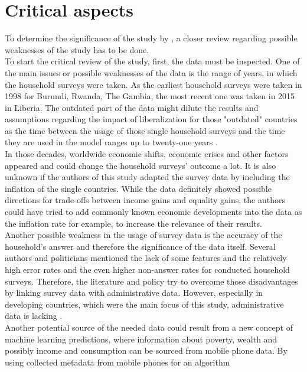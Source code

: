 \section{Critical aspects}

To determine the significance of the study by \cite{Artuc.2019}, a closer review regarding possible weaknesses of the
study has to be done.\\

To start the critical review of the study, first, the data must be inspected. One of the main issues or possible weaknesses
of the data is the range of years, in which the household surveys were taken. As the earliest household surveys were taken in 
1998 for Burundi, Rwanda, The Gambia, the most recent one was taken in 2015 in Liberia. The outdated part of the data might dilute the results and
assumptions regarding the impact of liberalization for those "outdated" countries as the time between the usage of those
single household surveys and the time they are used in the model ranges up to twenty-one years \parencite[pp.~56-57]{Artuc.2019}.\\ 
In those decades, worldwide economic shifts, economic crises and other factors appeared and could change the household surveys' 
outcome a lot. It is also unknown if the authors of this study adapted the survey data by including the inflation of the single countries. 
While the data definitely showed possible directions for trade-offs between income gains and equality gains, the authors could
have tried to add commonly known economic developments into the data as the inflation rate for example, to increase the 
relevance of their results.\\
Another possible weakness in the usage of survey data is the accuracy of the household's answer and therefore the significance 
of the data itself. Several authors and politicians mentioned the lack of some features and the relatively high error rates and 
the even higher non-answer rates for conducted household surveys. Therefore, the literature and policy try to overcome those
disadvantages by linking survey data with administrative data. However, especially in developing countries, which were the
main focus of this study, administrative data is lacking \parencite[pp.~255-256]{Meyer.2015}.\\
Another potential source of the needed data could result from a new concept of machine learning predictions, where information about poverty,
wealth and possibly income and consumption can be sourced from mobile phone data. By using collected metadata from mobile phones for an algorithm 
